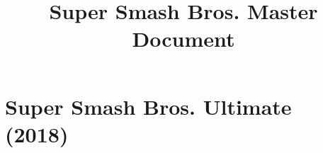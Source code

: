 \documentclass[a4paper]{article}
\title{Super Smash Bros. Master Document}
\begin{document}
	
	\maketitle\thispagestyle{empty}
	
	\newpage
	
	\tableofcontents
	
	\newpage
	
	\section{Super Smash Bros. Ultimate (2018)}
	
	
	
	
	
\end{document}
